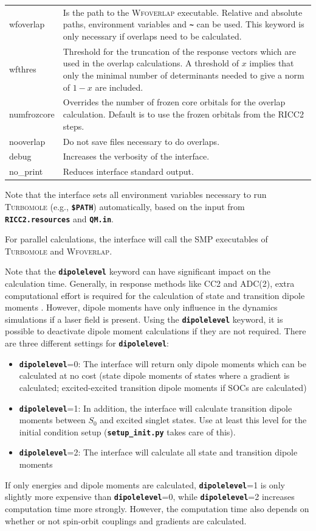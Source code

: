 \documentclass[a4paper,10pt,DIV=15,openany,twoside=false]{scrbook}
\newcommand{\ttt}[1]{\textbf{\texttt{#1}}}
\begin{document}
\begin{table}
\begin{tabular}{>{\ttfamily}lp{12cm}}
wfoverlap       &Is the path to the \textsc{Wfoverlap} executable. Relative and absolute paths, environment variables and \ttt{\textasciitilde} can be used. This keyword is only necessary if overlaps need to be calculated.\\
wfthres         &Threshold for the truncation of the response vectors which are used in the overlap calculations. A threshold of $x$ implies that only the minimal number of determinants needed to give a norm of $1-x$ are included.\\
numfrozcore     &Overrides the number of frozen core orbitals for the overlap calculation. Default is to use the frozen orbitals from the RICC2 steps.\\
nooverlap       &Do not save files necessary to do overlaps.\\
debug           &Increases the verbosity of the interface.\\
  no\_print       &Reduces interface standard output.\\
  \bottomrule
  \end{tabular}
\end{table}

Note that the interface sets all environment variables necessary to run \textsc{Turbomole} (e.g., \ttt{\$PATH}) automatically, based on the input from \ttt{RICC2.resources} and \ttt{QM.in}.

For parallel calculations, the interface will call the SMP executables of \textsc{Turbomole} and \textsc{Wfoverlap}.

Note that the \ttt{dipolelevel} keyword can have significant impact on the calculation time.
Generally, in response methods like CC2 and ADC(2), extra computational effort is required for the calculation of state and transition dipole moments .
However, dipole moments have only influence in the dynamics simulations if a laser field is present.
Using the \ttt{dipolelevel} keyword, it is possible to deactivate dipole moment calculations if they are not required.
There are three different settings for \ttt{dipolelevel}: 
\begin{itemize}
  \item \ttt{dipolelevel}=0: The interface will return only dipole moments which can be calculated at no cost (state dipole moments of states where a gradient is calculated; excited-excited transition dipole moments if SOCs are calculated)
  \item \ttt{dipolelevel}=1: In addition, the interface will calculate transition dipole moments between $S_0$ and excited singlet states. Use at least this level for the initial condition setup (\ttt{setup\_init.py} takes care of this).
  \item \ttt{dipolelevel}=2: The interface will calculate all state and transition dipole moments
\end{itemize}
If only energies and dipole moments are calculated, \ttt{dipolelevel}=1 is only slightly more expensive than \ttt{dipolelevel}=0, while \ttt{dipolelevel}=2 increases computation time more strongly.
However, the computation time also depends on whether or not spin-orbit couplings and gradients are calculated. 
\end{document}
